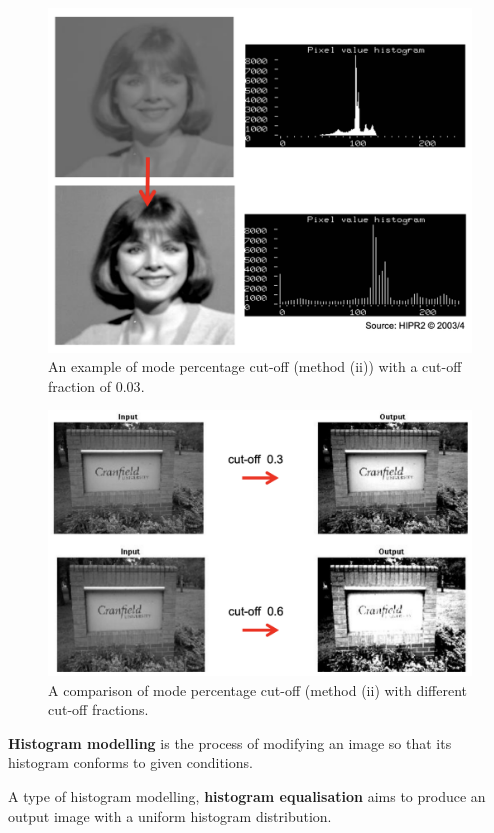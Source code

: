 \begin{figure}
    \centering
    \includegraphics[width=0.8\linewidth]{images/mode-cutoff.png}
    \caption{An example of mode percentage cut-off (method (ii)) with a cut-off fraction of $0.03$.}
    \label{fig:mode-cutoff}
\end{figure}

\begin{figure}
    \centering
    \includegraphics[width=0.8\linewidth]{images/mode-cutoff-2.png}
    \caption{A comparison of mode percentage cut-off (method (ii) with different cut-off fractions.}
    \label{fig:mode-cutoff-2}
\end{figure}

\begin{definition}
    \textbf{Histogram modelling} is the process of modifying an image so that its histogram conforms to given conditions.
\end{definition}

\begin{definition}
    A type of histogram modelling, \textbf{histogram equalisation} aims to produce an output image with a uniform histogram distribution. 
\end{definition}

